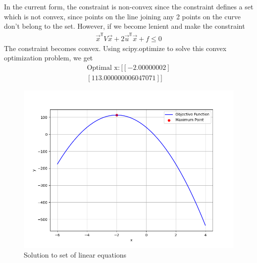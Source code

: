 \documentclass[journal]{IEEEtran}
\begin{document}
In the current form, the constraint is non-convex since the constraint defines a set which is not convex, since points on the
line joining any 2 points on the curve don't belong to the set. However, if we become lenient and make the constraint
\begin{align}
    \vec{x}^{\Top}V\vec{x} + 2\vec{u}^{\Top}\vec{x}+f\le 0
\end{align}
The constraint becomes convex. Using scipy.optimize to solve this convex optimization problem, we get \\
\begin{align}
    \text{Optimal x}: [[-2.00000002]\\
 [113.000000006047071]]
\end{align}
\begin{figure}[h!]
   \centering
   \includegraphics[width=0.7\columnwidth]{figs/fig.png}
    \caption{Solution to set of linear equations}
\end{figure}
\end{document}

